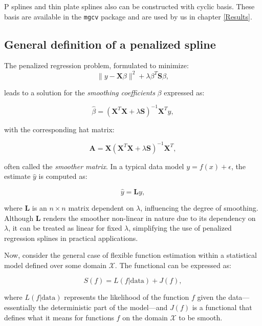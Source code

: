 \documentclass[
11pt, %
oneside, %
english, %
singlespacing, %
]{macthesis} %
\begin{document}
P splines and thin plate splines also can be constructed with cyclic basis. These basis are available in the \texttt{mgcv} package and are used by us in chapter \ref{Results}.

\subsection{General definition of a penalized spline}\label{General-definition-of-a-penalized-spline}

The penalized regression problem, formulated to minimize:
\begin{equation}
\|y - \mathbf{X}\beta\|^2 + \lambda \beta^T \mathbf{S} \beta,
\label{eq:penalizedregression}
\end{equation}

leads to a solution for the \emph{smoothing coefficients} \(\beta\) expressed as:

\begin{equation}
\hat{\beta} = (\mathbf{X}^T\mathbf{X}+ \lambda \mathbf{S})^{-1}\mathbf{X}^Ty,
\label{eq:penalizedleastsquaresminimizer}
\end{equation}

with the corresponding hat matrix:

\[
\mathbf{A} = \mathbf{X}(\mathbf{X}^T\mathbf{X}+ \lambda \mathbf{S})^{-1}\mathbf{X}^T,
\]

often called the \emph{smoother matrix}. In a typical data model \(y = f(x) + \epsilon\), the estimate \(\hat{y}\) is computed as:

\[
\hat{y} = \mathbf{L}y,
\]

where \(\mathbf{L}\) is an \(n \times n\) matrix dependent on \(\lambda\), influencing the degree of smoothing. Although \(\mathbf{L}\) renders the smoother non-linear in nature due to its dependency on \(\lambda\), it can be treated as linear for fixed \(\lambda\), simplifying the use of penalized regression splines in practical applications.

Now, consider the general case of flexible function estimation within a statistical model defined over some domain \(\mathcal{X}\). The functional can be expressed as:

\begin{equation}
S(f) = L(f | \text{data}) + J(f),
\label{eq: general penalized spline}
\end{equation}

where \(L(f | \text{data})\) represents the likelihood of the function \(f\) given the data---essentially the deterministic part of the model---and \(J(f)\) is a functional that defines what it means for functions \(f\) on the domain \(\mathcal{X}\) to be smooth.
\end{document}
